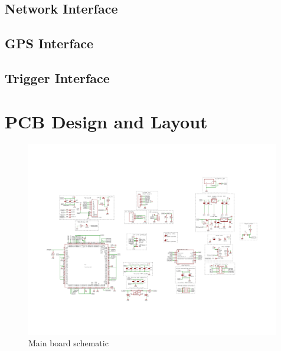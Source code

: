 \documentclass[12pt]{article}
\begin{document}
\newpage

\subsection{Network Interface}


\newpage

\subsection{GPS Interface}


\newpage

\subsection{Trigger Interface}


\newpage

\section{PCB Design and Layout}

\begin{figure}[h]
    \centering
    \includegraphics[angle=-90,width=0.99\textwidth]{BodyCamBoard_sch}
    \caption{Main board schematic}
\end{figure}
\end{document}
